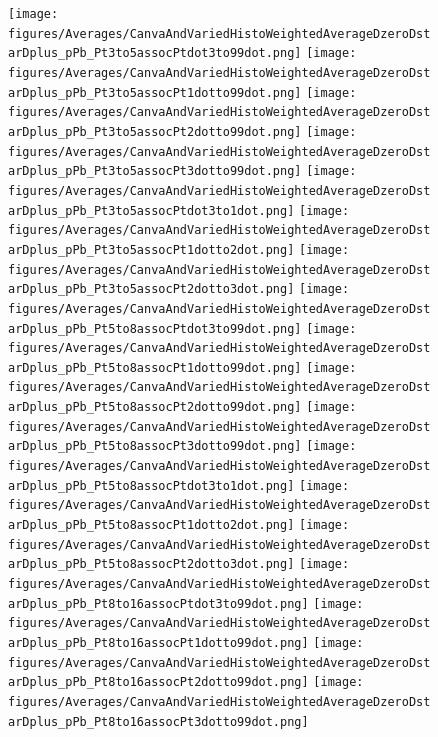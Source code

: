 \begin{figure}[!htbp]
\centering
{\texttt{[image: figures/Averages/CanvaAndVariedHistoWeightedAverageDzeroDstarDplus\_pPb\_Pt3to5assocPtdot3to99dot.png]}}
{\texttt{[image: figures/Averages/CanvaAndVariedHistoWeightedAverageDzeroDstarDplus\_pPb\_Pt3to5assocPt1dotto99dot.png]}}
{\texttt{[image: figures/Averages/CanvaAndVariedHistoWeightedAverageDzeroDstarDplus\_pPb\_Pt3to5assocPt2dotto99dot.png]}}
{\texttt{[image: figures/Averages/CanvaAndVariedHistoWeightedAverageDzeroDstarDplus\_pPb\_Pt3to5assocPt3dotto99dot.png]}}
{\texttt{[image: figures/Averages/CanvaAndVariedHistoWeightedAverageDzeroDstarDplus\_pPb\_Pt3to5assocPtdot3to1dot.png]}}
{\texttt{[image: figures/Averages/CanvaAndVariedHistoWeightedAverageDzeroDstarDplus\_pPb\_Pt3to5assocPt1dotto2dot.png]}}
{\texttt{[image: figures/Averages/CanvaAndVariedHistoWeightedAverageDzeroDstarDplus\_pPb\_Pt3to5assocPt2dotto3dot.png]}}
{\texttt{[image: figures/Averages/CanvaAndVariedHistoWeightedAverageDzeroDstarDplus\_pPb\_Pt5to8assocPtdot3to99dot.png]}}
{\texttt{[image: figures/Averages/CanvaAndVariedHistoWeightedAverageDzeroDstarDplus\_pPb\_Pt5to8assocPt1dotto99dot.png]}}
{\texttt{[image: figures/Averages/CanvaAndVariedHistoWeightedAverageDzeroDstarDplus\_pPb\_Pt5to8assocPt2dotto99dot.png]}}
{\texttt{[image: figures/Averages/CanvaAndVariedHistoWeightedAverageDzeroDstarDplus\_pPb\_Pt5to8assocPt3dotto99dot.png]}}
{\texttt{[image: figures/Averages/CanvaAndVariedHistoWeightedAverageDzeroDstarDplus\_pPb\_Pt5to8assocPtdot3to1dot.png]}}
{\texttt{[image: figures/Averages/CanvaAndVariedHistoWeightedAverageDzeroDstarDplus\_pPb\_Pt5to8assocPt1dotto2dot.png]}}
{\texttt{[image: figures/Averages/CanvaAndVariedHistoWeightedAverageDzeroDstarDplus\_pPb\_Pt5to8assocPt2dotto3dot.png]}}
{\texttt{[image: figures/Averages/CanvaAndVariedHistoWeightedAverageDzeroDstarDplus\_pPb\_Pt8to16assocPtdot3to99dot.png]}}
{\texttt{[image: figures/Averages/CanvaAndVariedHistoWeightedAverageDzeroDstarDplus\_pPb\_Pt8to16assocPt1dotto99dot.png]}}
{\texttt{[image: figures/Averages/CanvaAndVariedHistoWeightedAverageDzeroDstarDplus\_pPb\_Pt8to16assocPt2dotto99dot.png]}}
{\texttt{[image: figures/Averages/CanvaAndVariedHistoWeightedAverageDzeroDstarDplus\_pPb\_Pt8to16assocPt3dotto99dot.png]}}
\end{figure}
